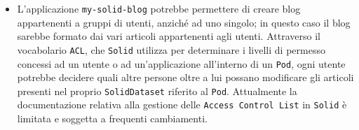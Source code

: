 \begin{itemize}
	\item L'applicazione {\tt my-solid-blog} potrebbe permettere di creare blog appartenenti a gruppi di utenti, anziché ad uno singolo; in questo caso il blog sarebbe formato dai vari articoli appartenenti agli utenti. Attraverso il vocabolario {\tt ACL}, che {\tt Solid} utilizza per determinare i livelli di permesso concessi ad un utente o ad un'applicazione all'interno di un {\tt Pod}, ogni utente potrebbe decidere quali altre persone oltre a lui possano modificare gli articoli presenti nel proprio {\tt SolidDataset} riferito al {\tt Pod}. Attualmente la documentazione relativa alla gestione delle {\tt Access Control List} in {\tt Solid} è limitata e soggetta a frequenti cambiamenti.
\end{itemize}	


\clearpage
